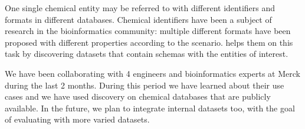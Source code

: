  One single chemical entity may be referred to with
different identifiers and formats in different databases. Chemical identifiers
have been a subject of research in the bioinformatics community: multiple
different formats have been proposed with different properties according to the
scenario. \dcv helps them on this task by discovering datasets that contain
schemas with the entities of interest.

We have been collaborating with 4 engineers and bioinformatics experts at Merck
during the last 2 months. During this period we have learned about their use
cases and we have used discovery on chemical databases that are publicly
available. In the future, we plan to integrate internal datasets too, with the
goal of evaluating \dcv with more varied datasets.

